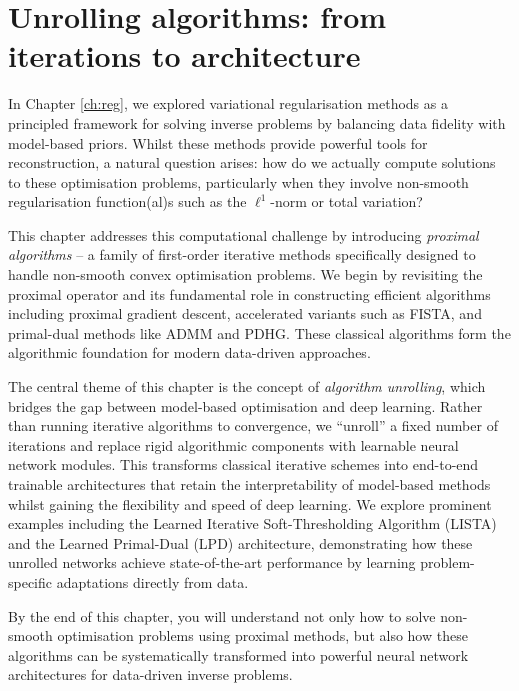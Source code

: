 \chapter{Unrolling algorithms: from iterations to architecture}\label{ch:unrolling}

In Chapter \ref{ch:reg}, we explored variational regularisation methods as a principled framework for solving inverse problems by balancing data fidelity with model-based priors. Whilst these methods provide powerful tools for reconstruction, a natural question arises: how do we actually compute solutions to these optimisation problems, particularly when they involve non-smooth regularisation function(al)s such as the $\ell^1$-norm or total variation?

This chapter addresses this computational challenge by introducing \emph{proximal algorithms} -- a family of first-order iterative methods specifically designed to handle non-smooth convex optimisation problems. We begin by revisiting the proximal operator and its fundamental role in constructing efficient algorithms including proximal gradient descent, accelerated variants such as FISTA, and primal-dual methods like ADMM and PDHG. These classical algorithms form the algorithmic foundation for modern data-driven approaches.

The central theme of this chapter is the concept of \emph{algorithm unrolling}, which bridges the gap between model-based optimisation and deep learning. Rather than running iterative algorithms to convergence, we ``unroll'' a fixed number of iterations and replace rigid algorithmic components with learnable neural network modules. This transforms classical iterative schemes into end-to-end trainable architectures that retain the interpretability of model-based methods whilst gaining the flexibility and speed of deep learning. We explore prominent examples including the Learned Iterative Soft-Thresholding Algorithm (LISTA) and the Learned Primal-Dual (LPD) architecture, demonstrating how these unrolled networks achieve state-of-the-art performance by learning problem-specific adaptations directly from data.

By the end of this chapter, you will understand not only how to solve non-smooth optimisation problems using proximal methods, but also how these algorithms can be systematically transformed into powerful neural network architectures for data-driven inverse problems.

